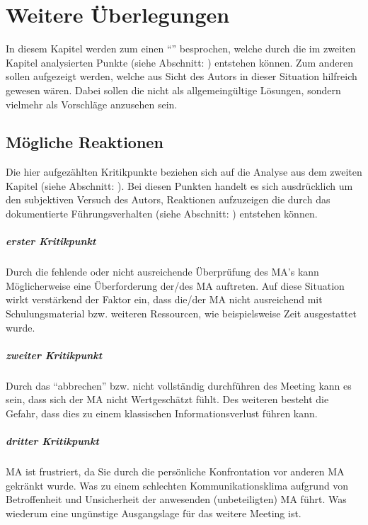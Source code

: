 \chapter{Weitere Überlegungen}
\label{chap:zusammenfassung}

In diesem Kapitel werden zum einen "`"' besprochen, welche durch die im zweiten Kapitel analysierten Punkte (siehe Abschnitt: ) entstehen können. 
Zum anderen sollen  aufgezeigt werden, welche aus Sicht des Autors in dieser Situation hilfreich gewesen wären. 
Dabei sollen die  nicht als allgemeingültige Lösungen, sondern vielmehr als Vorschläge anzusehen sein. 

\section{Mögliche Reaktionen}
\label{sec:moegl_reaktionen}

Die hier aufgezählten Kritikpunkte beziehen sich auf die Analyse aus dem zweiten Kapitel (siehe Abschnitt: ).
Bei diesen Punkten handelt es sich ausdrücklich um den subjektiven Versuch des Autors, Reaktionen aufzuzeigen die durch das dokumentierte Führungsverhalten (siehe Abschnitt: ) entstehen können.

\paragraph*{erster Kritikpunkt}
\label{par:1kritik}
Durch die fehlende oder nicht ausreichende Überprüfung des \ac{MA}'s kann Möglicherweise eine Überforderung der/des \ac{MA} auftreten. 
Auf diese Situation wirkt verstärkend der Faktor ein, dass die/der \ac{MA} nicht ausreichend mit Schulungsmaterial bzw. weiteren Ressourcen, wie beispielsweise Zeit ausgestattet wurde.  

\pagebreak

\paragraph*{zweiter Kritikpunkt}
\label{par:2kritik}
Durch das "`abbrechen"' bzw. nicht vollständig durchführen des Meeting kann es sein, dass sich der \ac{MA} nicht Wertgeschätzt fühlt. 
Des weiteren besteht die Gefahr, dass dies zu einem klassischen Informationsverlust führen kann. 


\paragraph*{dritter Kritikpunkt} 
\label{par:3kritik}
\ac{MA} ist frustriert, da Sie durch die persönliche Konfrontation vor anderen \ac{MA} gekränkt wurde. 
Was zu einem schlechten Kommunikationsklima aufgrund von Betroffenheit und Unsicherheit der anwesenden (unbeteiligten) \ac{MA} führt. 
Was wiederum eine ungünstige Ausgangslage für das weitere Meeting ist.\\

